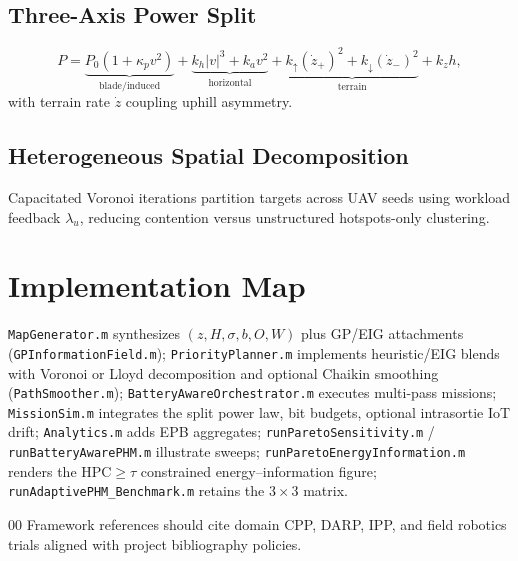 \documentclass[conference]{IEEEtran}
\begin{document}
\subsection{Three-Axis Power Split}
\begin{equation}
P = \underbrace{P_0(1{+}\kappa_p v^2)}_{\mathrm{blade/induced}} + \underbrace{k_h |v|^3 + k_a v^2}_{\mathrm{horizontal}} + \underbrace{k_{\uparrow}(\dot{z}_+)^2 + k_{\downarrow}(\dot{z}_-)^2}_{\mathrm{terrain}} + k_z h,
\end{equation}
with terrain rate $\dot{z}$ coupling uphill asymmetry.

\subsection{Heterogeneous Spatial Decomposition}
Capacitated Voronoi iterations partition targets across UAV seeds using workload feedback $\lambda_u$, reducing contention versus unstructured hotspots-only clustering.

\section{Implementation Map}
\texttt{MapGenerator.m} synthesizes $(z,H,\sigma,b,O,W)$ plus GP/EIG attachments (\texttt{GPInformationField.m}); \texttt{PriorityPlanner.m} implements heuristic/EIG blends with Voronoi or Lloyd decomposition and optional Chaikin smoothing (\texttt{PathSmoother.m}); \texttt{BatteryAwareOrchestrator.m} executes multi-pass missions; \texttt{MissionSim.m} integrates the split power law, bit budgets, optional intrasortie IoT drift; \texttt{Analytics.m} adds EPB aggregates; \texttt{runParetoSensitivity.m} / \texttt{runBatteryAwarePHM.m} illustrate sweeps; \texttt{runParetoEnergyInformation.m} renders the $\mathrm{HPC}\!\geq\!\tau$ constrained energy--information figure; \texttt{runAdaptivePHM\_Benchmark.m} retains the $3\times3$ matrix.


\begin{thebibliography}{00}
Framework references should cite domain CPP, DARP, IPP, and field robotics trials aligned with project bibliography policies.
\end{thebibliography}
\end{document}
